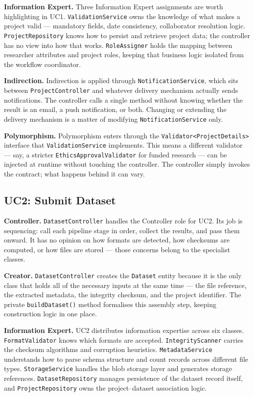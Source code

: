 \documentclass[12pt,a4paper]{article}
\newcommand{\code}[1]{\texttt{\small #1}}
\begin{document}
\noindent\textbf{Information Expert.}
Three Information Expert assignments are worth highlighting in UC1. \code{ValidationService} owns the knowledge of what makes a project valid --- mandatory fields, date consistency, collaborator resolution logic. \code{ProjectRepository} knows how to persist and retrieve project data; the controller has no view into how that works. \code{RoleAssigner} holds the mapping between researcher attributes and project roles, keeping that business logic isolated from the workflow coordinator.

\noindent\textbf{Indirection.}
Indirection is applied through \code{NotificationService}, which sits between \code{ProjectController} and whatever delivery mechanism actually sends notifications. The controller calls a single method without knowing whether the result is an email, a push notification, or both. Changing or extending the delivery mechanism is a matter of modifying \code{NotificationService} only.

\noindent\textbf{Polymorphism.}
Polymorphism enters through the \code{Validator<ProjectDetails>} interface that \code{ValidationService} implements. This means a different validator --- say, a stricter \code{EthicsApprovalValidator} for funded research --- can be injected at runtime without touching the controller. The controller simply invokes the contract; what happens behind it can vary.

\subsection{UC2: Submit Dataset}

\noindent\textbf{Controller.}
\code{DatasetController} handles the Controller role for UC2. Its job is sequencing: call each pipeline stage in order, collect the results, and pass them onward. It has no opinion on how formats are detected, how checksums are computed, or how files are stored --- those concerns belong to the specialist classes.

\noindent\textbf{Creator.}
\code{DatasetController} creates the \code{Dataset} entity because it is the only class that holds all of the necessary inputs at the same time --- the file reference, the extracted metadata, the integrity checksum, and the project identifier. The private \code{buildDataset()} method formalises this assembly step, keeping construction logic in one place.

\noindent\textbf{Information Expert.}
UC2 distributes information expertise across six classes. \code{FormatValidator} knows which formats are accepted. \code{IntegrityScanner} carries the checksum algorithms and corruption heuristics. \code{MetadataService} understands how to parse schema structure and count records across different file types. \code{StorageService} handles the blob storage layer and generates storage references. \code{DatasetRepository} manages persistence of the dataset record itself, and \code{ProjectRepository} owns the project--dataset association logic.
\end{document}
